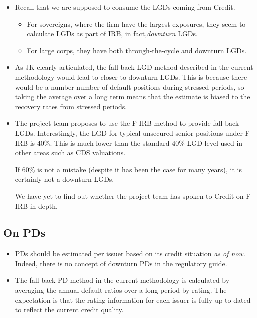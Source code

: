 \documentclass[12pt]{article}
\begin{document}
\begin{itemize}
    \item Recall that we are supposed to consume the LGDs coming from Credit. 
    \begin{itemize}
        \item For sovereigns, where the firm have the largest exposures, they seem to calculate LGDs as part of IRB, in fact,{\em downturn} LGDs.
        \item For large corps, they have both through-the-cycle and downturn LGDs.
    \end{itemize}
    \item As JK clearly articulated, the fall-back LGD method described in the current methodology would lead to closer to downturn LGDs. This is because there would be a number number of default positions during stressed periods, so taking the average over a long term means that the estimate is biased to the recovery rates from stressed periods. 
    \item The project team proposes to use the F-IRB method to provide fall-back LGDs. Interestingly, the LGD for typical unsecured senior positions under F-IRB is 40\%. This is much lower than the standard 40\% LGD level used in other areas such as CDS valuations. 
    
    If 60\% is not a mistake (despite it has been the case for many years), it is certainly not a downturn LGDs. 

    We have yet to find out whether the project team has spoken to Credit on F-IRB in depth. 
\end{itemize}

\subsection{On PDs}

\begin{itemize}
    \item PDs should be estimated per issuer based on its credit situation {\em as of now}. Indeed, there is no concept of downturn PDs in the regulatory guide. 
    \item The fall-back PD method in the current methodology is calculated by averaging the annual default ratios over a long period by rating. The expectation is that the rating information for each issuer is fully up-to-dated to reflect the current credit quality. 
\end{itemize}
\end{document}
